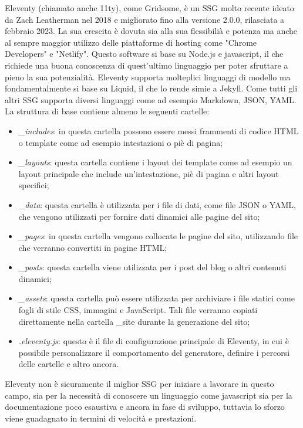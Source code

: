 \documentclass[target=bach,aauheader=]{thud}
\begin{document}
Eleventy (chiamato anche 11ty), come Gridsome, è un SSG molto recente ideato da Zach Leatherman nel 2018 e migliorato fino alla versione 2.0.0, rilasciata a febbraio 2023. 
La sua crescita è dovuta sia alla sua flessibilià e potenza ma anche al sempre maggior utilizzo delle piattaforme di hosting come "Chrome Developers" e "Netlify". \newline
Questo software si base su Node.js e javascript, il che richiede una buona conoscenza di quest'ultimo linguaggio per poter sfruttare a pieno la sua potenzialità. Eleventy supporta molteplici linguaggi di modello ma fondamentalmente si base su Liquid, il che lo rende simie a Jekyll.
Come tutti gli altri SSG supporta diversi linguaggi come ad esempio Markdown, JSON, YAML. \newline 
La struttura di base contiene almeno le seguenti cartelle:

\begin{itemize}
    \item \textit{\_includes}: in questa cartella possono essere messi frammenti di codice HTML o template come ad esempio intestazioni o piè di pagina;
    \item \textit{\_layouts}: questa cartella contiene i layout dei template come ad esempio un layout principale che include un'intestazione, piè di pagina e altri layout specifici;
    \item \textit{\_data}: questa cartella è utilizzata per i file di dati, come file JSON o YAML, che vengono utilizzati per fornire dati dinamici alle pagine del sito;
    \item \textit{\_pages}: in questa cartella vengono collocate le pagine del sito, utilizzando file che verranno convertiti in pagine HTML;
    \item \textit{\_posts}: questa cartella viene utilizzata per i post del blog o altri contenuti dinamici;
    \item \textit{\_assets}: questa cartella può essere utilizzata per archiviare i file statici come fogli di stile CSS, immagini e JavaScript. Tali file verranno copiati direttamente nella cartella \_site durante la generazione del sito;
    \item \textit{.eleventy.js}: questo è il file di configurazione principale di Eleventy, in cui è possibile personalizzare il comportamento del generatore, definire i percorsi delle cartelle e altro ancora.
\end{itemize}

Eleventy non è sicuramente il miglior SSG per iniziare a lavorare in questo campo, sia per la necessità di conoscere un linguaggio come javascript sia per la documentazione poco esaustiva e ancora in fase di sviluppo, tuttavia lo sforzo viene guadagnato in termini di velocità e prestazioni.   
\end{document}
